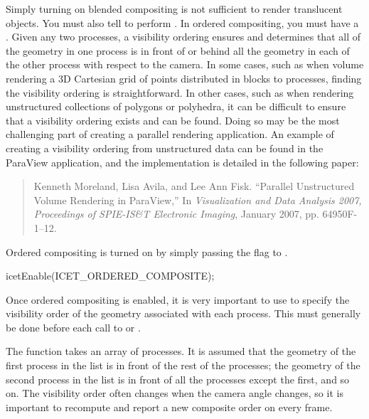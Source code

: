 
Simply turning on blended compositing is not sufficient to render
translucent objects.  You must also tell \IceT to perform .  In ordered compositing, you must have a
.  Given any two
processes, a visibility ordering ensures and determines that all of the
geometry in one process is in front of or behind all the geometry in each
of the other process with respect to the camera.  In some cases, such as
when volume rendering a 3D Cartesian grid of points distributed in blocks
to processes, finding the visibility ordering is straightforward.  In other
cases, such as when rendering unstructured collections of polygons or
polyhedra, it can be difficult to ensure that a visibility ordering exists
and can be found.  Doing so may be the most challenging part of creating a
parallel rendering application.  An example of creating a visibility
ordering from unstructured data can be found in the ParaView application,
and the implementation is detailed in the following paper:

\begin{quote}
  Kenneth Moreland, Lisa Avila, and Lee Ann Fisk. ``Parallel Unstructured
  Volume Rendering in ParaView,'' In \emph{Visualization and Data Analysis
    2007, Proceedings of SPIE-IS\&T Electronic Imaging}, January 2007,
  pp. 64950F-1--12.
\end{quote}

Ordered compositing is turned on by simply passing the
 flag to .
\begin{code}
  icetEnable(ICET_ORDERED_COMPOSITE);
\end{code}

Once ordered compositing is enabled, it is very important to use
 to specify the visibility order of the geometry
associated with each process.  This must generally be done before each call
to  or .
\begin{Table}{1}
  \textC{(} 
   \textC{);}
\end{Table}
The  function takes an array of processes.  It is
assumed that the geometry of the first process in the list is in front of
the rest of the processes; the geometry of the second process in the list
is in front of all the processes except the first, and so on.  The
visibility order often changes when the camera angle changes, so it is
important to recompute and report a new composite order on every frame.

